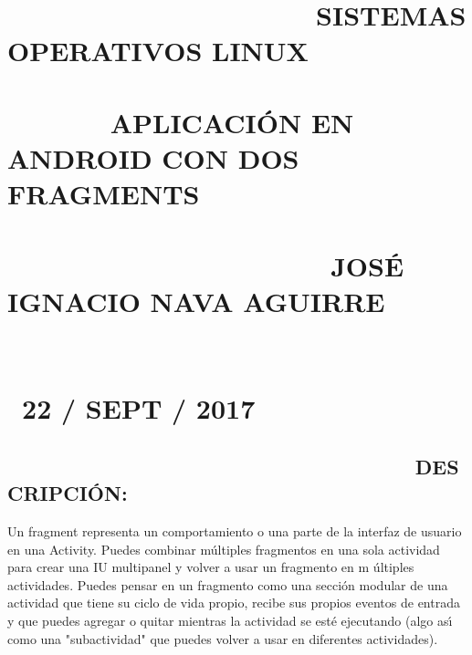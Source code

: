 \documentclass{article}
\begin{document}
\section{\protect{}}

\bigskip 

\section{ \ \ \ \ \ \ \ \ \ \ \ \ \ \ \ \ \ \ \ \ \ SISTEMAS OPERATIVOS LINUX%
}

\bigskip 

\section{ \ \ \ \ \ \ \ APLICACI\'{O}N EN ANDROID CON DOS FRAGMENTS}

\bigskip 

\section{ \ \ \ \ \ \ \ \ \ \ \ \ \ \ \ \ \ \ \ \ \ \ JOS\'{E} IGNACIO NAVA
AGUIRRE}

\bigskip 

\section{ \ \ \ \ \ \ \ \ \ \ \ \ \ \ \ \ \ \ \ \ \ \ \ \ \ \ \ \ \ \ \ \ 22
/ SEPT / 2017}

\bigskip 

\bigskip 

\bigskip 

\subsection{\protect\bigskip\ \ \ \ \ \ \ \ \ \ \ \ \ \ \ \ \ \ \ \ \ \ \ \
\ \ \ \ \ \ \ \ \ \ \ \ \ DESCRIPCI\'{O}N:}

\bigskip Un fragment representa un comportamiento o una parte de la interfaz
de usuario en una Activity. Puedes combinar m\'{u}ltiples fragmentos en una
sola actividad para crear una IU multipanel y volver a usar un fragmento en m%
\'{u}ltiples actividades. Puedes pensar en un fragmento como una secci\'{o}n
modular de una actividad que tiene su ciclo de vida propio, recibe sus
propios eventos de entrada y que puedes agregar o quitar mientras la
actividad se est\'{e} ejecutando (algo as\'{\i} como una "subactividad" que
puedes volver a usar en diferentes actividades).
\end{document}

